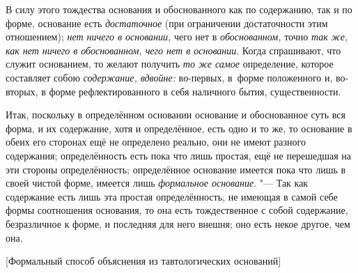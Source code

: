 В силу этого тождества основания и обоснованного как по содержанию, так и по
форме, основание есть {\em достаточное} (при ограничении достаточности этим
отношением); {\em нет ничего в основании,} чего нет в {\em обоснованном,} точно
{\em так же, как нет ничего в обоснованном, чего нет в основании}. Когда
спрашивают, что служит основанием, то желают получить {\em то же самое}
определение, которое составляет собою {\em содержание, вдвойне:} во-первых,
в~форме положенного и, во-вторых, в форме рефлектированного в себя наличного
бытия, существенности.

Итак, поскольку в определённом основании основание и обоснованное суть вся
форма, и их содержание, хотя и определённое, есть одно и то же, то основание в
обеих его сторонах ещё не определено реально, они не имеют разного содержания;
определённость есть пока что лишь простая, ещё не перешедшая на эти стороны
определённость; определённое основание имеется пока что лишь в своей чистой
форме, имеется лишь {\em формальное основание}. "--- Так как содержание есть
лишь эта простая определённость, не имеющая в самой себе формы соотношения
основания, то она есть тождественное с собой содержание, безразличное к форме,
и последняя для него внешня; оно есть некое другое, чем она.

%
{[Формальный способ объяснения из тавтологических оснований]}


